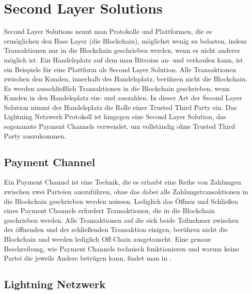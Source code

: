 \section{Second Layer Solutions}
Second Layer Solutions nennt man Protokolle und Plattformen, die es ermöglichen den Base Layer (die Blockchain), möglichst wenig zu belasten, indem Transaktionen nur in die Blockchain geschrieben werden, wenn es nicht anderes möglich ist. Ein Handelsplatz auf dem man Bitcoins an- und verkaufen kann, ist ein Beispiele für eine Plattform als Second Layer Solution. Alle Transaktionen zwischen den Kunden, innerhalb des Handelsplatz, berühren nicht die Blockchain. Es werden ausschließlich Transaktionen in die Blockchain geschrieben, wenn Kunden in den Handelsplatz ein- und auszahlen. In dieser Art der Second Layer Solution nimmt der Handelsplatz die Rolle einer Trusted Third Party ein. Das Lightning Netzwerk Protokoll ist hingegen eine Second Layer Solution, das sogenannte Payment Channels verwendet, um vollständig ohne Trusted Third Party auszukommen.


\subsection{Payment Channel}

Ein Payment Channel ist eine Technik, die es erlaubt eine Reihe von Zahlungen zwischen zwei Parteien auszuführen, ohne das dabei alle Zahlungstransaktionen in die Blockchain geschrieben werden müssen. Lediglich das Öffnen und Schließen eines Payment Channels erfordert Transaktionen, die in die Blockchain geschrieben werden. Alle Transaktionen auf die sich beide Teilnehmer zwischen der öffnenden und der schließenden Transaktion einigen, berühren nicht die Blockchain und werden lediglich Off-Chain ausgetauscht. Eine genaue Beschreibung, wie Payment Channels technisch funktionieren und warum keine Partei die jeweils Andere betrügen kann, findet man in \cite{lightning_white_paper}.

\subsection{Lightning Netzwerk}

